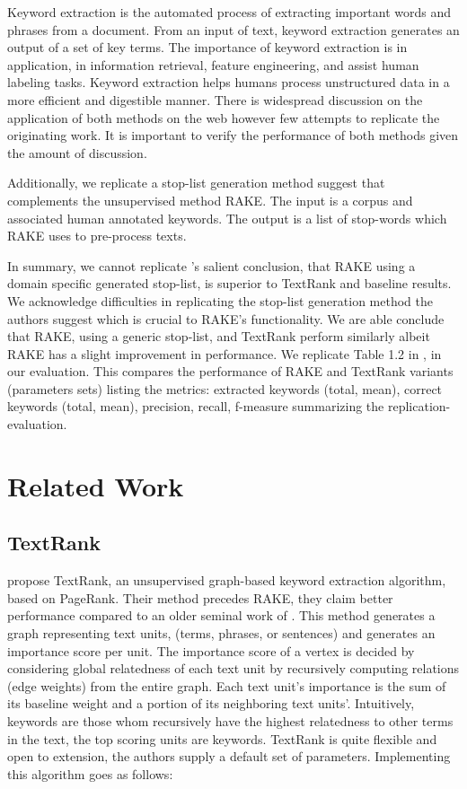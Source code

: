 \documentclass[11pt,a4paper]{article}
\begin{document}
Keyword extraction is the automated process of extracting important words and phrases from a document. From an input of text, keyword extraction generates an output of a set of key terms. The importance of keyword extraction is in application, in information retrieval, feature engineering, and assist human labeling tasks. Keyword extraction helps humans process unstructured data in a more efficient and digestible manner. There is widespread discussion on the application of both methods on the web however few attempts to replicate the originating work. It is important to verify the performance of both methods given the amount of discussion.  

Additionally, we replicate a stop-list generation method \citet{1} suggest that complements the unsupervised method RAKE. The input is a corpus and associated human annotated keywords. The output is a list of stop-words which RAKE uses to pre-process texts. 

In summary, we cannot replicate \citet{1}'s salient conclusion, that RAKE using a domain specific generated stop-list, is superior to TextRank and baseline results. We acknowledge difficulties in replicating the stop-list generation method the authors suggest which is crucial to RAKE's functionality. We are able conclude that RAKE, using a generic stop-list, and TextRank perform similarly albeit RAKE has a slight improvement in performance. We replicate Table 1.2 in \citet{1}, in our evaluation. This compares the performance of RAKE and TextRank variants (parameters sets) listing the metrics: extracted keywords (total, mean), correct keywords (total, mean), precision, recall, f-measure summarizing the replication-evaluation. 

\section{Related Work}

\subsection{TextRank}

\citet{4} propose TextRank, an unsupervised graph-based keyword extraction algorithm, based on PageRank. Their method precedes RAKE, they claim better performance compared to an older seminal work of \citet{hulth-2003-improved}. This method generates a graph representing text units, (terms, phrases, or sentences) and generates an importance score per unit. The importance score of a vertex is decided by considering global relatedness of each text unit by recursively computing relations (edge weights) from the entire graph. Each text unit's importance is the sum of its baseline weight and a portion of its neighboring text units'. Intuitively, keywords are those whom recursively have the highest relatedness to other terms in the text, the top scoring units are keywords. TextRank is quite flexible and open to extension, the authors supply a default set of parameters. Implementing this algorithm goes as follows:
\end{document}
